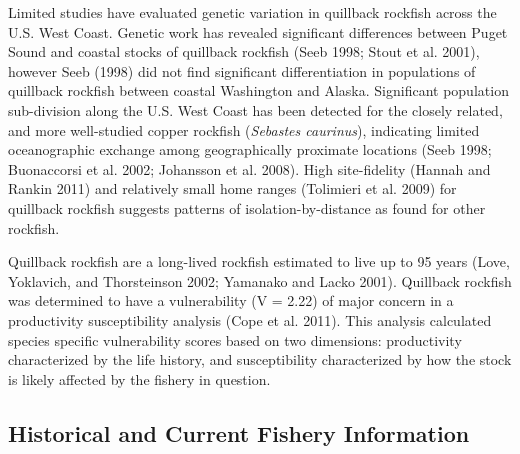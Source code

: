 \documentclass[11pt,
  english,
  a4paper,
]{article}
\begin{document}
Limited studies have evaluated genetic variation in quillback rockfish across the U.S. West Coast. Genetic work has revealed significant differences between Puget Sound and coastal stocks of quillback rockfish {(Seeb 1998; Stout et al. 2001)\leavevmode\tagmcend\tagstructend}, however Seeb {(1998)\leavevmode\tagmcend\tagstructend} did not find significant differentiation in populations of quillback rockfish between coastal Washington and Alaska. Significant population sub-division along the U.S. West Coast has been detected for the closely related, and more well-studied copper rockfish (\emph{Sebastes caurinus}), indicating limited oceanographic exchange among geographically proximate locations {(Seeb 1998; Buonaccorsi et al. 2002; Johansson et al. 2008)\leavevmode\tagmcend\tagstructend}. High site-fidelity {(Hannah and Rankin 2011)\leavevmode\tagmcend\tagstructend} and relatively small home ranges {(Tolimieri et al. 2009)\leavevmode\tagmcend\tagstructend} for quillback rockfish suggests patterns of isolation-by-distance as found for other rockfish.

\leavevmode\tagmcend\tagstructend\par


Quillback rockfish are a long-lived rockfish estimated to live up to 95 years {(Love, Yoklavich, and Thorsteinson 2002; Yamanako and Lacko 2001)\leavevmode\tagmcend\tagstructend}. Quillback rockfish was determined to have a vulnerability (V = 2.22) of major concern in a productivity susceptibility analysis {(Cope et al. 2011)\leavevmode\tagmcend\tagstructend}. This analysis calculated species specific vulnerability scores based on two dimensions: productivity characterized by the life history, and susceptibility characterized by how the stock is likely affected by the fishery in question.

\leavevmode\tagmcend\tagstructend\par


\hypertarget{historical-and-current-fishery-information}{%
\subsection{Historical and Current Fishery Information}\label{historical-and-current-fishery-information}}
\end{document}
